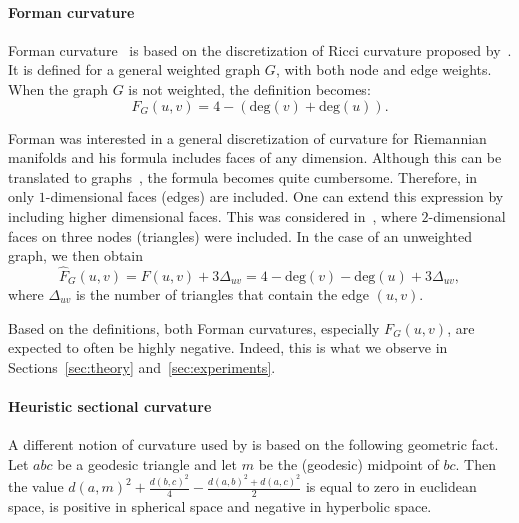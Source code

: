 \documentclass{article} %
\begin{document}
\paragraph{Forman curvature}

Forman curvature~\citep{sreejith2016forman} is based on the discretization of Ricci curvature proposed by~\citet{forman2003bochner}. It is defined for a general weighted graph $G$, with both node and edge weights. %
When the graph $G$ is not weighted, 
the definition becomes:
\begin{equation}\label{eq:forman1}
F_G(u,v) 
= 4 - (\mathrm{deg}(v) + \mathrm{deg}(u)).
\end{equation}

Forman was interested in a general discretization of curvature for Riemannian manifolds and his formula includes faces of any dimension. Although this can be translated to graphs~\citep{weber2017coarse}, the formula becomes quite cumbersome. Therefore, in~ only $1$-dimensional faces (edges) are included. One can extend this expression by including higher dimensional faces. This was considered in~\citep{samal2018comparative}, where $2$-dimensional faces on three nodes (triangles) were included. In the case of an unweighted graph, we then obtain
\begin{equation}\label{eq:forman2}
	\hat F_G(u,v) = F(u,v) + 3\Delta_{uv} 
	= 4 - \mathrm{deg}(v) - \mathrm{deg}(u) + 3\Delta_{uv},
\end{equation}
where $\Delta_{uv}$ is the number of triangles that contain the edge $(u,v)$. 

Based on the definitions, both Forman curvatures, especially $F_G(u,v)$, are expected to often be highly negative. Indeed, this is what we observe in Sections~\ref{sec:theory} and~\ref{sec:experiments}.

\paragraph{Heuristic sectional curvature}

A different notion of curvature used by \citet{gu2019learning} is based on the following geometric fact. 
Let $abc$ be a geodesic triangle and let $m$ be the (geodesic) midpoint of $bc$. Then the value
$	d(a,m)^2 + \frac{d(b,c)^2}{4} - \frac{d(a,b)^2 + d(a,c)^2}{2}$
is equal to zero in euclidean space, is positive in spherical space and negative in hyperbolic space.
\end{document}
